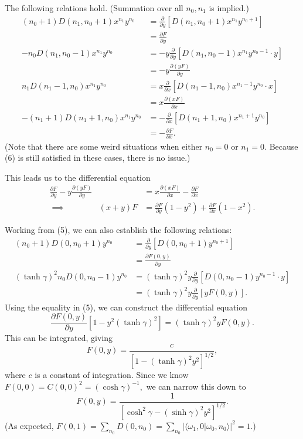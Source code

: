 \documentclass[12pt]{article}
\begin{document}
The following relations hold. (Summation over all $n_0,n_1$ is implied.)
\begin{align*}
	(n_0+1)D(n_1,n_0+1)x^{n_1}y^{n_0} &= \frac{\partial }{\partial y} \left[ D(n_1,n_0+1)x^{n_1} y^{n_0+1} \right] \\
					  &= \frac{\partial F}{\partial y} \\
	-n_0 D(n_1,n_0-1)x^{n_1}y^{n_0} &= -y \frac{\partial }{\partial y} \left[ D(n_1,n_0-1) x^{n_1}y^{n_0-1}\cdot y \right]  \\
					&= -y \frac{\partial (yF)}{\partial y} \\
	n_1 D(n_1-1,n_0) x^{n_1}y^{n_0} &= x\frac{\partial }{\partial x} \left[ D(n_1-1,n_0) x^{n_1-1}y^{n_0}\cdot x \right] \\
					&= x \frac{\partial (xF)}{\partial x} \\
	- (n_1+1) D(n_1+1, n_0) x^{n_1}y^{n_0} &= - \frac{\partial }{\partial x}\left[ D(n_1+1,n_0) x^{n_1+1} y^{n_0} \right] \\
					       &= -\frac{\partial F}{\partial x}.
\end{align*}
(Note that there are some weird situations when either $n_0=0$ or $n_1=0$. Because (6) is still satisfied in these cases, there is no issue.)

This leads us to the differential equation
\begin{align}
	\frac{\partial F}{\partial y} - y\frac{\partial (yF)}{\partial y} &= x\frac{\partial (xF)}{\partial x} - \frac{\partial F}{\partial x} \nonumber \\
	\implies \qquad \qquad (x+y) F &= \frac{\partial F}{\partial y}(1-y^2) + \frac{\partial F}{\partial x}(1-x^2).
\end{align}

Working from (5), we can also establish the following relations:
\begin{align*}
	(n_0+1)D(0,n_0+1)y^{n_0} &= \frac{\partial }{\partial y} \left[ D(0,n_0+1) y^{n_0+1} \right] \\
				 &= \frac{\partial F(0,y)}{\partial y} \\
	(\tanh \gamma)^2 n_0 D(0,n_0-1) y^{n_0} &= (\tanh \gamma)^2 y \frac{\partial }{\partial y} \left[ D(0,n_0-1) y^{n_0-1}\cdot y \right] \\
						&= (\tanh \gamma)^{2} y \frac{\partial}{\partial y}\left[ y F(0,y) \right] .
\end{align*}
Using the equality in (5), we can construct the differential equation
\[
	\frac{\partial F(0,y)}{\partial y}\left[ 1- y^2 (\tanh \gamma)^{2} \right] = (\tanh \gamma)^{2} y F(0,y).
\] 
This can be integrated, giving
\[
	F(0,y) = \frac{c}{\left[ 1-(\tanh \gamma)^2 y^2 \right] ^{1/2}},
\] 
where $c$ is a constant of integration.  Since we know $F(0,0) = C(0,0)^{2} = (\cosh \gamma)^{-1},$ we can narrow this down to
\begin{equation}
	F(0,y) = \frac{1}{\left[ \cosh^2 \gamma - (\sinh \gamma)^{2}y^{2} \right] ^{1/2}}.
\end{equation}
(As expected, $F(0,1) = \sum_{n_0} D(0,n_0) = \sum_{n_0} |\langle \omega_1,0|\omega_0,n_0\rangle|^{2}  = 1.$)
\end{document}
